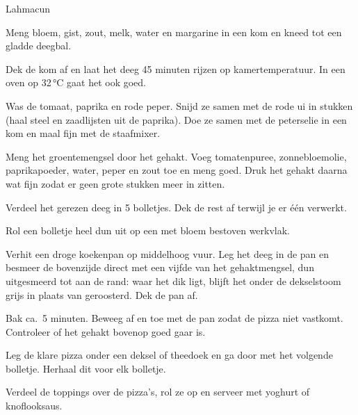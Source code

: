 \begin{recipe}{Lahmacun}
\begin{steps}
  \item Meng bloem, gist, zout, melk, water en margarine in een kom en kneed
        tot een gladde deegbal.
  \item Dek de kom af en laat het deeg 45 minuten rijzen op kamertemperatuur.
        In een oven op 32\,°C gaat het ook goed.
  \item Was de tomaat, paprika en rode peper. Snijd ze samen met de
        rode ui in stukken (haal steel en zaadlijsten uit de paprika). Doe ze samen met de peterselie in een kom
        en maal fijn met de staafmixer.
  \item Meng het groentemengsel door het gehakt. Voeg tomatenpuree,
        zonnebloemolie, paprikapoeder, water, peper en zout toe en meng goed.
        Druk het gehakt daarna wat fijn zodat er geen grote stukken meer in zitten.
  \item Verdeel het gerezen deeg in 5 bolletjes. Dek de rest af terwijl je er
        één verwerkt.
  \item Rol een bolletje heel dun uit op een met bloem bestoven werkvlak.
  \item Verhit een droge koekenpan op middelhoog vuur. Leg het deeg in de pan
        en besmeer de bovenzijde direct met een vijfde van het gehaktmengsel,
        dun uitgesmeerd tot aan de rand: waar het dik ligt, blijft het onder
        de dekselstoom grijs in plaats van geroosterd. Dek de pan af.
  \item Bak ca.\ 5 minuten. Beweeg af en toe met de pan zodat de pizza niet
        vastkomt. Controleer of het gehakt bovenop goed gaar is.
  \item Leg de klare pizza onder een deksel of theedoek en ga door met het
        volgende bolletje. Herhaal dit voor elk bolletje.
  \item Verdeel de toppings over de pizza's, rol ze op en serveer met yoghurt
        of knoflooksaus.
\end{steps}

\end{recipe}
